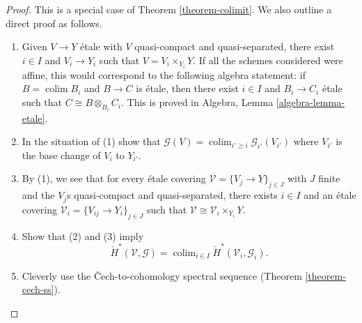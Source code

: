 \documentclass[10pt,a4paper]{amsart}
\theoremstyle{plain}
\theoremstyle{definition}
\theoremstyle{remark}
\numberwithin{equation}{subsection}
\def\colim{\mathop{\mathrm{colim}}\nolimits}
\begin{document}
\begin{proof}
This is a special case of Theorem \ref{theorem-colimit}.
We also outline a direct proof as follows.
\begin{enumerate}
\item Given $V \to Y$ \'etale with $V$ quasi-compact and
quasi-separated, there exist $i\in I$ and $V_i \to Y_i$ such that
$V = V_i \times_{Y_i} Y$.
If all the schemes considered were affine, this would correspond to the
following algebra statement: if $B = \colim B_i$ and $B \to C$ is \'etale,
then there exist $i \in I$ and $B_i \to C_i$ \'etale such that
$C \cong B \otimes_{B_i} C_i$.
This is proved in Algebra, Lemma \ref{algebra-lemma-etale}.
\item In the situation of (1) show that
$\mathcal{G}(V) = \colim_{i' \geq i} \mathcal{G}_{i'}(V_{i'})$
where $V_{i'}$ is the base change of $V_i$ to $Y_{i'}$.
\item By (1), we see that for every \'etale covering
$\mathcal{V} = \{V_j \to Y\}_{j\in J}$ with $J$ finite and the
$V_j$s quasi-compact and quasi-separated, there exists $i \in I$ and
an \'etale covering $\mathcal{V}_i = \{V_{ij} \to Y_i\}_{j \in J}$
such that $\mathcal{V} \cong \mathcal{V}_i \times_{Y_i} Y$.
\item Show that (2) and (3) imply
$$
\check H^*(\mathcal{V}, \mathcal{G})=
\colim_{i\in I} \check H^*(\mathcal{V}_i, \mathcal{G}_i).
$$
\item Cleverly use the {\v C}ech-to-cohomology spectral sequence
(Theorem \ref{theorem-cech-ss}).
\end{enumerate}
\end{proof}
\end{document}
